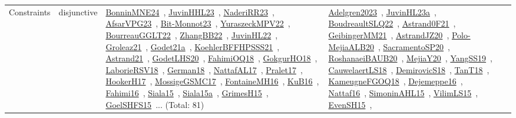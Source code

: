 {\begin{longtable}{lp{3cm}>{\raggedright\arraybackslash}p{6cm}>{\raggedright\arraybackslash}p{6cm}>{\raggedright\arraybackslash}p{8cm}}
Constraints & disjunctive & \href{../works/BonninMNE24.pdf}{BonninMNE24}~\cite{BonninMNE24}, \href{../works/JuvinHHL23.pdf}{JuvinHHL23}~\cite{JuvinHHL23}, \href{../works/NaderiRR23.pdf}{NaderiRR23}~\cite{NaderiRR23}, \href{../works/AfsarVPG23.pdf}{AfsarVPG23}~\cite{AfsarVPG23}, \href{../works/Bit-Monnot23.pdf}{Bit-Monnot23}~\cite{Bit-Monnot23}, \href{../works/YuraszeckMPV22.pdf}{YuraszeckMPV22}~\cite{YuraszeckMPV22}, \href{../works/BourreauGGLT22.pdf}{BourreauGGLT22}~\cite{BourreauGGLT22}, \href{../works/ZhangBB22.pdf}{ZhangBB22}~\cite{ZhangBB22}, \href{../works/JuvinHL22.pdf}{JuvinHL22}~\cite{JuvinHL22}, \href{../works/Groleaz21.pdf}{Groleaz21}~\cite{Groleaz21}, \href{../works/Godet21a.pdf}{Godet21a}~\cite{Godet21a}, \href{../works/KoehlerBFFHPSSS21.pdf}{KoehlerBFFHPSSS21}~\cite{KoehlerBFFHPSSS21}, \href{../works/Astrand21.pdf}{Astrand21}~\cite{Astrand21}, \href{../works/GodetLHS20.pdf}{GodetLHS20}~\cite{GodetLHS20}, \href{../works/FahimiOQ18.pdf}{FahimiOQ18}~\cite{FahimiOQ18}, \href{../works/GokgurHO18.pdf}{GokgurHO18}~\cite{GokgurHO18}, \href{../works/LaborieRSV18.pdf}{LaborieRSV18}~\cite{LaborieRSV18}, \href{../works/German18.pdf}{German18}~\cite{German18}, \href{../works/NattafAL17.pdf}{NattafAL17}~\cite{NattafAL17}, \href{../works/Pralet17.pdf}{Pralet17}~\cite{Pralet17}, \href{../works/HookerH17.pdf}{HookerH17}~\cite{HookerH17}, \href{../works/MossigeGSMC17.pdf}{MossigeGSMC17}~\cite{MossigeGSMC17}, \href{../works/FontaineMH16.pdf}{FontaineMH16}~\cite{FontaineMH16}, \href{../works/KuB16.pdf}{KuB16}~\cite{KuB16}, \href{../works/Fahimi16.pdf}{Fahimi16}~\cite{Fahimi16}, \href{../works/Siala15.pdf}{Siala15}~\cite{Siala15}, \href{../works/Siala15a.pdf}{Siala15a}~\cite{Siala15a}, \href{../works/GrimesH15.pdf}{GrimesH15}~\cite{GrimesH15}, \href{../works/GoelSHFS15.pdf}{GoelSHFS15}~\cite{GoelSHFS15}... (Total: 81) & \href{../works/Adelgren2023.pdf}{Adelgren2023}~\cite{Adelgren2023}, \href{../works/JuvinHL23a.pdf}{JuvinHL23a}~\cite{JuvinHL23a}, \href{../works/BoudreaultSLQ22.pdf}{BoudreaultSLQ22}~\cite{BoudreaultSLQ22}, \href{../works/Astrand0F21.pdf}{Astrand0F21}~\cite{Astrand0F21}, \href{../works/GeibingerMM21.pdf}{GeibingerMM21}~\cite{GeibingerMM21}, \href{../works/AstrandJZ20.pdf}{AstrandJZ20}~\cite{AstrandJZ20}, \href{../works/Polo-MejiaALB20.pdf}{Polo-MejiaALB20}~\cite{Polo-MejiaALB20}, \href{../works/SacramentoSP20.pdf}{SacramentoSP20}~\cite{SacramentoSP20}, \href{../works/RoshanaeiBAUB20.pdf}{RoshanaeiBAUB20}~\cite{RoshanaeiBAUB20}, \href{../works/MejiaY20.pdf}{MejiaY20}~\cite{MejiaY20}, \href{../works/YangSS19.pdf}{YangSS19}~\cite{YangSS19}, \href{../works/CauwelaertLS18.pdf}{CauwelaertLS18}~\cite{CauwelaertLS18}, \href{../works/DemirovicS18.pdf}{DemirovicS18}~\cite{DemirovicS18}, \href{../works/TanT18.pdf}{TanT18}~\cite{TanT18}, \href{../works/KameugneFGOQ18.pdf}{KameugneFGOQ18}~\cite{KameugneFGOQ18}, \href{../works/Dejemeppe16.pdf}{Dejemeppe16}~\cite{Dejemeppe16}, \href{../works/Nattaf16.pdf}{Nattaf16}~\cite{Nattaf16}, \href{../works/SimoninAHL15.pdf}{SimoninAHL15}~\cite{SimoninAHL15}, \href{../works/VilimLS15.pdf}{VilimLS15}~\cite{VilimLS15}, \href{../works/EvenSH15.pdf}{EvenSH15}~\cite{EvenSH15}, 
\end{longtable}}
